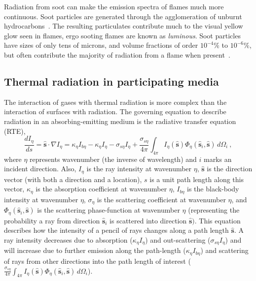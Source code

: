 Radiation from soot can make the emission spectra of flames much more continuous.
Soot particles are generated through the agglomeration of unburnt hydrocarbons~\cite{Mueller2013LargeCombustor}. The resulting particulates contribute much to the visual yellow glow seen in flames, ergo sooting flames are known as \textit{luminous}. 
Soot particles have sizes of only tens of microns, and volume fractions of order $10^{-4}$\% to $10^{-6}$\%, but often contribute the majority of radiation from a flame when present~\cite{Modest2016RadiativeSystems}.

\subsection{Thermal radiation in participating media} \label{section:RTE}
The interaction of gases with thermal radiation is more complex than the interaction of surfaces with radiation. The governing equation to describe radiation in an absorbing-emitting medium is the radiative transfer equation (RTE),
\begin{equation}
    \frac{dI_\eta{}}{ds} = \hat{\textbf{s}} \cdot \nabla{I_\eta{}} = \kappa{}_\eta{}I_{b\eta{}}-\kappa{}_\eta{}I_\eta{}-\sigma{}_{s\eta{}}I_\eta{}+\frac{\sigma{}_{s\eta{}}}{4\pi}\int_{4\pi{}}{I_\eta{}(\hat{\textbf{s}})\Phi_\eta{}(\hat{\textbf{s}}_i,\hat{\textbf{s}})}\,d\Omega{}_i \ ,
    \label{eq:RTE2}
\end{equation}
where $\eta{}$ represents wavenumber (the inverse of wavelength) and $i$ marks an incident direction. Also, $I_\eta{}$ is the ray intensity at wavenumber $\eta$, $\hat{\textbf{s}}$ is the direction vector (with both a direction and a location), $s$ is a unit path length along this vector, $\kappa{}_\eta$ is the absorption coefficient at wavenumber $\eta{}$, $I_{b\eta}$ is the black-body intensity at wavenumber $\eta$, $\sigma{}_\eta{}$ is the scattering coefficient at wavenumber $\eta{}$, and $\Phi{}_\eta{}(\hat{\textbf{s}}_i,\hat{\textbf{s}})$ is the scattering phase-function at wavenumber $\eta{}$ (representing the probability a ray from direction $\hat{\textbf{s}}_i$ is scattered into direction $\hat{\textbf{s}})$.
This equation describes how the intensity of a pencil of rays changes along a path length $\hat{\textbf{s}}$. A ray intensity decreases due to absorption ($\kappa{}_\eta{}I_\eta{}$) and out-scattering ($\sigma{}_{s\eta{}}I_\eta{}$) and will increase due to further emission along the path-length ($\kappa{}_\eta{}I_{b\eta{}}$) and scattering of rays from other directions into the path length of interest ($\frac{\sigma{}_{s\eta{}}}{4\pi}\int_{4\pi{}}{I_\eta{}(\hat{\textbf{s}})\Phi_\eta{}(\hat{\textbf{s}}_i,\hat{\textbf{s}})}\,d\Omega{}_i$). 

